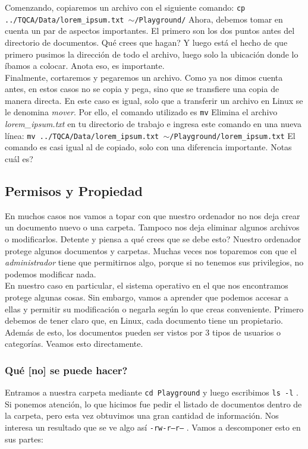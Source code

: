 \documentclass[10pt,letterpaper]{article}
\newcommand{\inlinecode}[1]{
\colorbox{light-gray}{\texttt{#1}}
}
\begin{document}
Comenzando, copiaremos un archivo con el siguiente comando: \inlinecode{cp ../TQCA/Data/lorem\_ipsum.txt $\sim$/Playground/} Ahora, debemos tomar en cuenta un par de aspectos importantes. El primero son los dos puntos antes del directorio de documentos. Qu\'e crees que hagan? Y luego est\'a el hecho de que primero pusimos la direcci\'on de todo el archivo, luego solo la ubicaci\'on donde lo \'ibamos a colocar. Anota eso, es importante.\\

Finalmente, cortaremos y pegaremos un archivo. Como ya nos dimos cuenta antes, en estos casos no se copia y pega, sino que se transfiere una copia de manera directa. En este caso es igual, solo que a transferir un archivo en Linux se le denomina \emph{mover}. Por ello, el comando utilizado es \inlinecode{mv} Elimina el archivo \emph{lorem\_ipsum.txt} en tu directorio de trabajo e ingresa este comando en una nueva l\'inea: \inlinecode{mv ../TQCA/Data/lorem\_ipsum.txt $ \sim $/Playground/lorem\_ipsum.txt} El comando es casi igual al de copiado, solo con una diferencia importante. Notas cu\'al es?

\subsection{Permisos y Propiedad}
En muchos casos nos vamos a topar con que nuestro ordenador no nos deja crear un documento nuevo o una carpeta. Tampoco nos deja eliminar algunos archivos o modificarlos. Detente y piensa a qu\'e crees que se debe esto? Nuestro ordenador protege algunos documentos y carpetas. Muchas veces nos toparemos con que el \emph{administrador} tiene que permitirnos algo, porque si no tenemos sus privilegios, no podemos modificar nada.\\

En nuestro caso en particular, el sistema operativo en el que nos encontramos protege algunas cosas. Sin embargo, vamos a aprender que podemos accesar a ellas y permitir su modificaci\'on o negarla seg\'un lo que creas conveniente. Primero debemos de tener claro que, en Linux, cada documento tiene un propietario. Adem\'as de esto, los documentos pueden ser vistos por 3 tipos de usuarios o categor\'ias. Veamos esto directamente.

\subsubsection{Qu\'e [no] se puede hacer?}
Entramos a nuestra carpeta mediante \inlinecode{cd Playground} y luego escribimos \inlinecode{ls -l}. Si ponemos atenci\'on, lo que hicimos fue pedir el listado de documentos dentro de la carpeta, pero esta vez obtuvimos una gran cantidad de informaci\'on. Nos interesa un resultado que se ve algo as\'i \inlinecode{-rw-r--r--}. Vamos a descomponer esto en sus partes:
\end{document}
